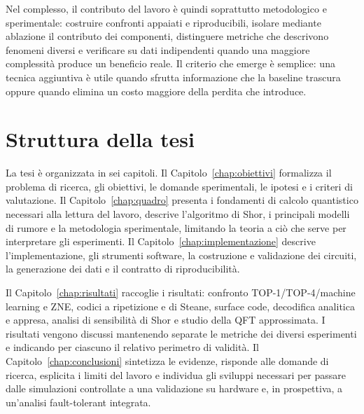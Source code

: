 \begin{onehalfspace}
Nel complesso, il contributo del lavoro è quindi soprattutto metodologico e
sperimentale: costruire confronti appaiati e riproducibili, isolare mediante ablazione
il contributo dei componenti, distinguere metriche che descrivono fenomeni diversi e
verificare su dati indipendenti quando una maggiore complessità produce un beneficio
reale. Il criterio che emerge è semplice: una tecnica aggiuntiva è utile quando sfrutta
informazione che la baseline trascura oppure quando elimina un costo maggiore della
perdita che introduce.

\section{Struttura della tesi}

La tesi è organizzata in sei capitoli. Il Capitolo~\ref{chap:obiettivi} formalizza il problema di ricerca,
gli obiettivi, le domande sperimentali, le ipotesi e i criteri di valutazione. Il
Capitolo~\ref{chap:quadro} presenta i fondamenti di calcolo quantistico necessari alla lettura del
lavoro, descrive l'algoritmo di Shor, i principali modelli di rumore e la metodologia
sperimentale, limitando la teoria a ciò che serve per interpretare gli esperimenti. Il
Capitolo~\ref{chap:implementazione} descrive l'implementazione, gli strumenti software, la costruzione e
validazione dei circuiti, la generazione dei dati e il contratto di riproducibilità.

Il Capitolo~\ref{chap:risultati} raccoglie i risultati: confronto TOP-1/TOP-4/machine learning e ZNE,
codici a ripetizione e di Steane, surface code, decodifica analitica e appresa, analisi
di sensibilità di Shor e studio della QFT approssimata. I risultati vengono discussi
mantenendo separate le metriche dei diversi esperimenti e indicando per ciascuno il
relativo perimetro di validità. Il Capitolo~\ref{chap:conclusioni} sintetizza le evidenze, risponde alle
domande di ricerca, esplicita i limiti del lavoro e individua gli sviluppi necessari per
passare dalle simulazioni controllate a una validazione su hardware e, in prospettiva, a
un'analisi fault-tolerant integrata.

\end{onehalfspace}
